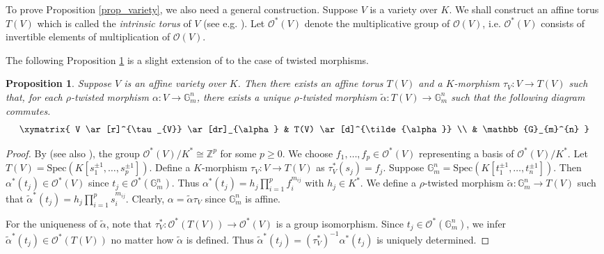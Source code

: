 \documentclass[12pt]{amsart}
\theoremstyle{plain}
\newtheorem{proposition}[theorem]{Proposition}
\theoremstyle{definition}
\theoremstyle{question}
\theoremstyle{remark}
\theoremstyle{assumption}
\numberwithin{equation}{section}
\theoremstyle{bigthm}
\begin{document}
To prove Proposition \ref{prop_variety}, we also need a general construction. Suppose $V$ is a variety over $K$. We shall construct an affine torus $T(V)$ which is called the \textit{intrinsic torus} of $V$ (see e.g. \cite[p.~280]{Maclagan_Sturmfels}). Let $\mathcal{O}^{*} (V)$ denote the multiplicative group of $\mathcal{O} (V)$, i.e. $\mathcal{O}^{*} (V)$ consists of invertible elements of multiplication of $\mathcal{O} (V)$.

The following Proposition \ref{prop_torus} is a slight extension of \cite[Proposition~6.4.4]{Maclagan_Sturmfels} to the case of twisted morphisms.
\begin{proposition}\label{prop_torus}
Suppose $V$ is an affine variety over $K$. Then there exists an affine torus $T(V)$ and a $K$-morphism $\tau_{V} \colon  V \rightarrow T(V)$ such that, for each $\rho$-twisted morphism $\alpha \colon  V \rightarrow \mathbb{G}_{m}^{n}$, there exists a unique $\rho$-twisted morphism $\tilde{\alpha} \colon  T(V) \rightarrow \mathbb{G}_{m}^{n}$ such that the following diagram commutes.
\[
  \xymatrix{
  V \ar[r]^{\tau_{V}} \ar[dr]_{\alpha} & T(V) \ar[d]^{\tilde{\alpha}} \\
  & \mathbb{G}_{m}^{n} }
\]
\end{proposition}
\begin{proof}
By \cite[p.~28,~Lemma]{Rosenlicht} (see also \cite[Lemma~6.4.1]{Maclagan_Sturmfels}), the group $\mathcal{O}^{*} (V)/K^{*} \cong \mathbb{Z}^{p}$ for some $p \geq 0$. We choose $f_{1}, \dots, f_{p} \in \mathcal{O}^{*} (V)$ representing a basis of $\mathcal{O}^{*} (V)/K^{*}$. Let $T(V) = \mathrm{Spec}(K[s_{1}^{\pm 1}, \dots, s_{p}^{\pm 1}])$. Define a $K$-morphism $\tau_{V} \colon  V \rightarrow T(V)$ as $\tau_{V}^{*} (s_{j}) = f_{j}$. Suppose $\mathbb{G}_{m}^{n} = \mathrm{Spec}(K[t_{1}^{\pm 1}, \dots, t_{n}^{\pm 1}])$. Then $\alpha^{*} (t_{j}) \in \mathcal{O}^{*} (V)$ since $t_{j} \in \mathcal{O}^{*} (\mathbb{G}_{m}^{n})$. Thus $\alpha^{*} (t_{j}) = h_{j} \prod_{i=1}^{p} f_{i}^{m_{ij}}$ with $h_{j} \in K^{*}$. We define a $\rho$-twisted morphism $\tilde{\alpha} \colon  \mathbb{G}_{m}^{n} \rightarrow T(V)$ such that $\tilde{\alpha}^{*} (t_{j}) = h_{j} \prod_{i=1}^{p} s_{i}^{m_{ij}}$. Clearly, $\alpha = \tilde{\alpha} \tau_{V}$ since $\mathbb{G}_{m}^{n}$ is affine.

For the uniqueness of $\tilde{\alpha}$, note that $\tau_{V}^{*} \colon  \mathcal{O}^{*} (T(V)) \rightarrow \mathcal{O}^{*} (V)$ is a group isomorphism. Since $t_{j} \in \mathcal{O}^{*} (\mathbb{G}_{m}^{n})$, we infer $\tilde{\alpha}^{*} (t_{j}) \in \mathcal{O}^{*} (T(V))$ no matter how $\tilde{\alpha}$ is defined. Thus $\tilde{\alpha}^{*} (t_{j}) = (\tau_{V}^{*})^{-1} \alpha^{*} (t_{j})$ is uniquely determined.
\end{proof}
\end{document}
